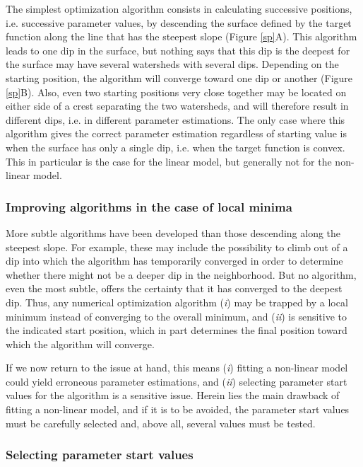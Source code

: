 The simplest optimization algorithm consists in calculating successive positions, i.e. successive parameter values, by descending the surface defined by the target function along the line that has the steepest slope (Figure \ref{sp}A). This algorithm leads to one dip in the surface, but nothing says that this dip is the deepest for the surface may have several watersheds with several dips. Depending on the starting position, the algorithm will converge toward one dip or another (Figure \ref{sp}B). Also, even two starting positions very close together may be located on either side of a crest separating the two watersheds, and will therefore result in different dips, i.e. in different parameter estimations. The only case where this algorithm gives the correct parameter estimation regardless of starting value is when the surface has only a single dip, i.e. when the target function is convex. This in particular is the case for the linear model, but generally not for the non-linear model.

\subsubsection{Improving algorithms in the case of local minima}

More subtle algorithms have been developed than those descending along the steepest slope. For example, these may include the possibility to climb out of a dip into which the algorithm has temporarily converged in order to determine whether there might not be a deeper dip in the neighborhood. But no algorithm, even the most subtle, offers the certainty that it has converged to the deepest dip. Thus, any numerical optimization algorithm (\emph{i}) may be trapped by a local minimum instead of converging to the overall minimum, and (\emph{ii}) is sensitive to the indicated start position, which in part determines the final position toward which the algorithm will converge.

If we now return to the issue at hand, this means (\emph{i}) fitting a non-linear model could yield erroneous parameter estimations, and (\emph{ii}) selecting parameter start values for the algorithm is a sensitive issue. Herein lies the main drawback of fitting a non-linear model, and if it is to be avoided, the parameter start values must be carefully selected and, above all, several values must be tested.

\subsubsection{Selecting parameter start values}

